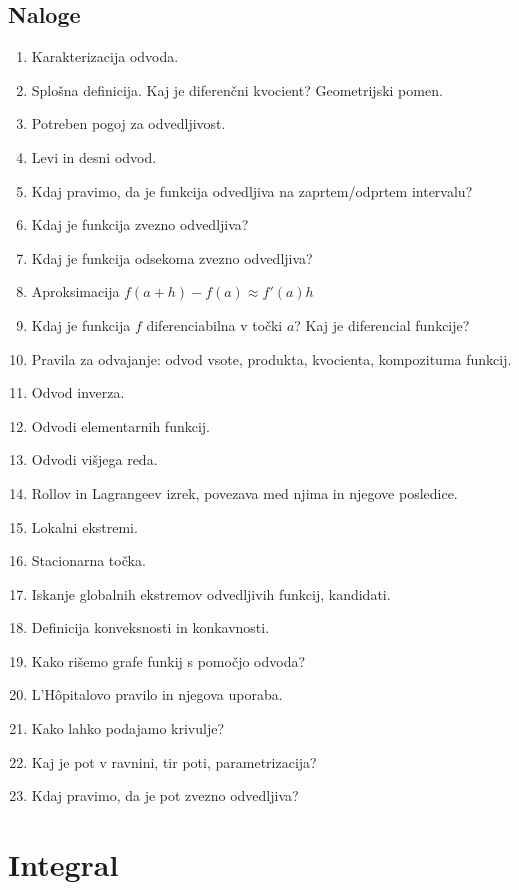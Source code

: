 \documentclass[a4paper,12pt]{report}
\begin{document}
\section*{Naloge}
\begin{enumerate}
    \item Karakterizacija odvoda.
    \item Splošna definicija. Kaj je diferenčni kvocient? Geometrijski pomen.
    \item Potreben pogoj za odvedljivost.
    \item Levi in desni odvod.
    \item Kdaj pravimo, da je funkcija odvedljiva na zaprtem/odprtem intervalu?
    \item Kdaj je funkcija zvezno odvedljiva?
    \item Kdaj je funkcija odsekoma zvezno odvedljiva?
    \item Aproksimacija $ f(a+h) - f(a) \approx f'(a) h $
    \item Kdaj je funkcija $f$ diferenciabilna v točki $a$? Kaj je diferencial funkcije?
    \item Pravila za odvajanje: odvod vsote, produkta, kvocienta, kompozituma funkcij.
    \item Odvod inverza.
    \item Odvodi elementarnih funkcij.
    \item Odvodi višjega reda.
    \item Rollov in Lagrangeev izrek, povezava med njima in njegove posledice.
    \item Lokalni ekstremi.
    \item Stacionarna točka.
    \item Iskanje globalnih ekstremov odvedljivih funkcij, kandidati.
    \item Definicija konveksnosti in konkavnosti.
    \item Kako rišemo grafe funkij s pomočjo odvoda?
    \item L'Hôpitalovo pravilo in njegova uporaba.
    \item Kako lahko podajamo krivulje?
    \item Kaj je pot v ravnini, tir poti, parametrizacija?
    \item Kdaj pravimo, da je pot zvezno odvedljiva?
\end{enumerate}




\chapter{Integral}
\end{document}
